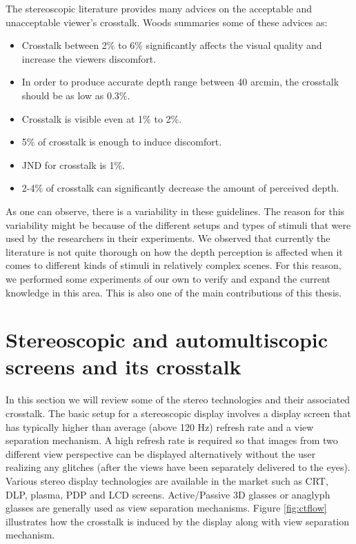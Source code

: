 The stereoscopic literature provides many advices on the acceptable and unacceptable viewer's crosstalk. Woods\cite{woods2012crosstalk} summaries some of these advices as:
\begin{itemize}
	\item Crosstalk between 2\% to 6\% significantly affects the visual quality and increase the viewers discomfort.
	\item In order to produce accurate depth range between 40 arcmin, the crosstalk should be as low as 0.3\%.
	\item Crosstalk is visible even at 1\% to 2\%.
	\item 5\% of crosstalk is enough to induce discomfort.
	\item JND for crosstalk is 1\%.
	\item 2-4\% of crosstalk can significantly decrease the amount of perceived depth.
\end{itemize}

As one can observe, there is a variability in these guidelines. The reason for this variability might be because of the different setups and types of stimuli that were used by the researchers in their experiments. We observed that currently the literature is not quite thorough on how the depth perception is affected when it comes to different kinds of stimuli in relatively complex scenes. For this reason, we performed some experiments of our own to verify and expand the current knowledge in this area. This is also one of the main contributions of this thesis.

\section{Stereoscopic and automultiscopic screens and its crosstalk}

In this section we will review some of the stereo technologies and their associated crosstalk. The basic setup for a stereoscopic display involves a display screen that has typically higher than average (above 120 Hz) refresh rate and a view separation mechanism. A high refresh rate is required so that images from two different view perspective can be displayed alternatively without the user realizing any glitches (after the views have been separately delivered to the eyes). Various stereo display technologies are available in the market such as CRT, DLP, plasma, PDP and LCD screens. Active/Passive 3D glasses or anaglyph glasses are generally used as view separation mechanisms. Figure \ref{fig:ctflow} illustrates how the crosstalk is induced by the display along with view separation mechanism.

